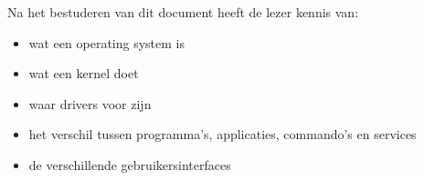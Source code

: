 Na het bestuderen van dit document heeft de lezer kennis van:
\begin{itemize}
\item wat een operating system is
\item wat een kernel doet
\item waar drivers voor zijn
\item het verschil tussen programma's, applicaties, commando's en services
\item de verschillende gebruikersinterfaces
\end{itemize}
